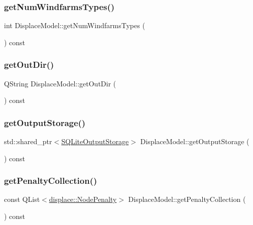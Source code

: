 \subsubsection{\texorpdfstring{getNumWindfarmsTypes()}{getNumWindfarmsTypes()}}
{\footnotesize\ttfamily int Displace\+Model\+::get\+Num\+Windfarms\+Types (\begin{DoxyParamCaption}{ }\end{DoxyParamCaption}) const}

\mbox{\label{class_displace_model_a82e56722ade1c90788c7f2ab629f7ec3}} 
\subsubsection{\texorpdfstring{getOutDir()}{getOutDir()}}
{\footnotesize\ttfamily Q\+String Displace\+Model\+::get\+Out\+Dir (\begin{DoxyParamCaption}{ }\end{DoxyParamCaption}) const}

\mbox{\label{class_displace_model_a0ab79ebec2fcb009c6fe4373541afbc4}} 
\subsubsection{\texorpdfstring{getOutputStorage()}{getOutputStorage()}}
{\footnotesize\ttfamily std\+::shared\+\_\+ptr$<$\mbox{\hyperlink{class_s_q_lite_output_storage}{S\+Q\+Lite\+Output\+Storage}}$>$ Displace\+Model\+::get\+Output\+Storage (\begin{DoxyParamCaption}{ }\end{DoxyParamCaption}) const\hspace{0.3cm}{\ttfamily [inline]}}

\mbox{\label{class_displace_model_ae69e43d4acbea20edec16e0786fd00a8}} 
\subsubsection{\texorpdfstring{getPenaltyCollection()}{getPenaltyCollection()}}
{\footnotesize\ttfamily const Q\+List$<$\mbox{\hyperlink{classdisplace_1_1_node_penalty}{displace\+::\+Node\+Penalty}}$>$ Displace\+Model\+::get\+Penalty\+Collection (\begin{DoxyParamCaption}{ }\end{DoxyParamCaption}) const\hspace{0.3cm}{\ttfamily [inline]}}

